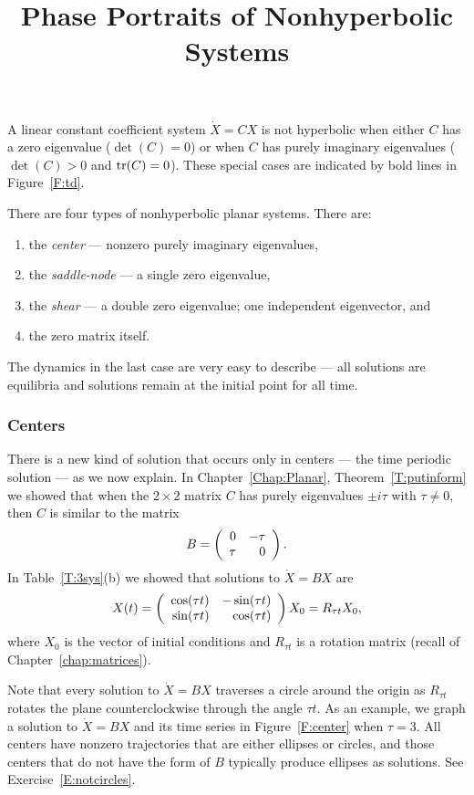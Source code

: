 \documentclass{ximera}
\title{Phase Portraits of Nonhyperbolic Systems}
\begin{document}
\begin{abstract}
\end{abstract}
\maketitle

 \label{S:6.9}

A linear constant coefficient system $\dot{X}=CX$ is not hyperbolic
when either $C$ has a zero eigenvalue ($\det(C)=0$) or when $C$ has
purely imaginary eigenvalues ($\det(C)>0$ and ${\rm tr}(C)=0$).  These
special cases are indicated by bold lines in Figure~\ref{F:td}.

There are four types of nonhyperbolic planar systems.  There are:
\begin{enumerate}
\item	the {\em center} --- nonzero purely imaginary
eigenvalues,
\item	the {\em saddle-node\/} --- a single
zero eigenvalue,
\item	the {\em shear\/} --- a double zero eigenvalue;
one  independent eigenvector, and
\item	the zero matrix itself.
\end{enumerate}
The dynamics in the last case are very easy to describe --- all solutions
are equilibria and solutions remain at the initial point for all time.

\subsubsection*{Centers}

There is a new kind of solution that occurs only in centers --- the time
periodic solution --- as we now explain.
In Chapter~\ref{Chap:Planar},
Theorem~\ref{T:putinform} we showed that when the $2\times 2$
matrix $C$ has purely eigenvalues $\pm i\tau$ with $\tau\neq 0$, then $C$
is similar to the matrix
\[
B =   \left(\begin{array}{rr} 0 & -\tau\\ \tau &0\end{array}\right).
\]
In Table~\ref{T:3sys}(b) we showed that solutions to $\dot{X}=BX$ are
\[
X(t) = \left(\begin{array}{rr} \cos(\tau t) & -\sin(\tau t)\\ \sin(\tau t) &\cos(\tau t)\end{array}\right)X_0
=R_{\tau t}X_0,
\]
where $X_0$ is the vector of initial conditions and $R_{\tau t}$ is a
rotation matrix (recall  of Chapter~\ref{chap:matrices}).

Note that every solution to $\dot{X}=BX$ traverses a circle around the
origin as $R_{\tau t}$ rotates the plane counterclockwise through the angle
$\tau t$.  As an example, we graph
a solution to $\dot{X}=BX$ and its time
series in Figure~\ref{F:center} when $\tau=3$.  All centers have nonzero
trajectories that are either ellipses or circles, and
those centers that do
not have the form of $B$ typically produce ellipses as solutions.  See
Exercise~\ref{E:notcircles}.
\end{document}

